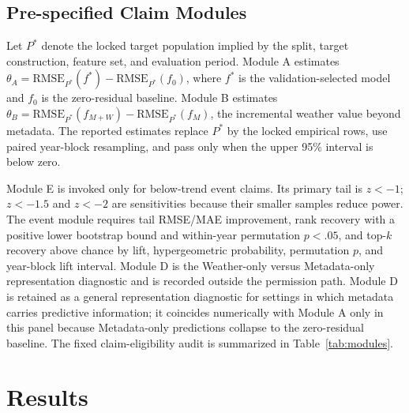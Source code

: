 \documentclass[conference]{IEEEtran}
\renewcommand{\arraystretch}{0.98}
\begin{document}
\subsection{Pre-specified Claim Modules}
Let $P^\ast$ denote the locked target population implied by the split, target
construction, feature set, and evaluation period. Module A estimates
$\theta_A=\mathrm{RMSE}_{P^\ast}(f^\ast)-\mathrm{RMSE}_{P^\ast}(f_0)$, where
$f^\ast$ is the validation-selected model and $f_0$ is the zero-residual baseline.
Module B estimates
$\theta_B=\mathrm{RMSE}_{P^\ast}(f_{M+W})-\mathrm{RMSE}_{P^\ast}(f_M)$, the
incremental weather value beyond metadata. The reported estimates replace
$P^\ast$ by the locked empirical rows, use paired year-block resampling,
and pass only when the upper 95\% interval is below zero.

Module E is invoked only for below-trend event claims. Its primary tail is $z<-1$;
$z<-1.5$ and $z<-2$ are sensitivities because their smaller samples reduce power.
The event module requires tail RMSE/MAE improvement, rank recovery with a positive
lower bootstrap bound and within-year permutation $p<.05$, and top-$k$ recovery
above chance by lift, hypergeometric probability, permutation $p$, and year-block
lift interval. Module D is the Weather-only versus Metadata-only representation
diagnostic and is recorded outside the permission path. Module D is retained as a
general representation diagnostic for settings in which metadata carries
predictive information; it coincides numerically with Module A only in this panel
because Metadata-only predictions collapse to the zero-residual baseline. The
fixed claim-eligibility audit is summarized in Table~\ref{tab:modules}.

\begin{table}[t]
\centering
\caption{Fixed claim-eligibility modules and locked crop-panel verdicts. Module D
(Weather-only versus Metadata-only) is a descriptive representation diagnostic
outside the permission path and is therefore not a required row. Full
configuration details are in the reproducibility manifest.}
\label{tab:modules}
\footnotesize
\renewcommand{\arraystretch}{1.12}
\resizebox{\textwidth}{!}{}
\end{table}

\section{Results}
\end{document}
